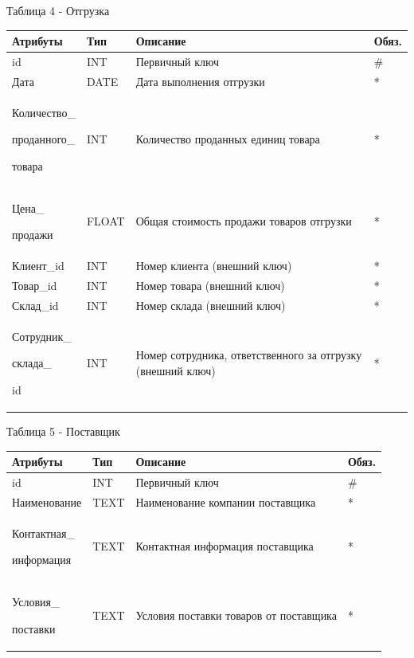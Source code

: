 \documentclass[14pt]{extreport}
\begin{document}
\newpage

\noindent
Таблица 4 - Отгрузка

\begin{center}
\begin{longtable}{ |m{3.3cm}|m{3cm}|m{6cm}|m{1.8cm}| } 
 \hline
 Атрибуты & Тип & Описание & Обяз. \\ [0.5ex] 
 \hline\hline
 id & INT & Первичный ключ & \# \\
 \hline
 Дата & DATE & Дата выполнения отгрузки & * \\
 \hline
 Количество\_
 
 проданного\_
 
 товара & INT & Количество проданных единиц товара & * \\
 \hline
 Цена\_
 
 продажи & FLOAT & Общая стоимость продажи товаров отгрузки & * \\
 \hline
 Клиент\_id & INT & Номер клиента (внешний ключ) & * \\
 \hline
 Товар\_id & INT & Номер товара (внешний ключ) & * \\
 \hline
 Склад\_id & INT & Номер склада (внешний ключ) & * \\
 \hline
 Сотрудник\_
 
 склада\_
 
 id & INT & Номер сотрудника, ответственного за отгрузку (внешний ключ) & * \\
 \hline
\end{longtable}
\end{center}



\noindent
Таблица 5 - Поставщик

\begin{center}
\begin{longtable}{ |m{3.3cm}|m{3cm}|m{6cm}|m{1.8cm}| } 
 \hline
 Атрибуты & Тип & Описание & Обяз. \\ [0.5ex] 
 \hline\hline
 id & INT & Первичный ключ & \# \\
 \hline
 Наименование & TEXT & Наименование компании поставщика & * \\
 \hline
 Контактная\_
 
 информация & TEXT & Контактная информация поставщика & * \\
 \hline
 Условия\_
 
 поставки & TEXT & Условия поставки товаров от поставщика & * \\
 \hline
\end{longtable}
\end{center}
\end{document}
